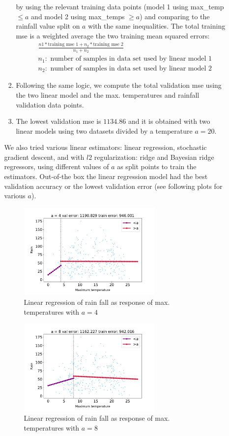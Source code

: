 \documentclass[12pt,twoside]{article}
\begin{document}
\begin{enumerate}
\begin{enumerate}
\begin{enumerate}[(1)]
		by using the relevant training data points (model 1 using max\_temp $\le a$ and  model 2 using max\_temps $\ge a$)
		and comparing to the rainfall value split on $a$ with the same inequalities. 
		The total training mse is a weighted average the two training mean squared errors: 
		\begin{align*}
			& \frac{n1 * \text{training mse  1} + n_2  * \text{training mse 2}} {n_1 + n_2} \\
			& n_1: \text{ number of samples in data set used by linear model 1} \\
			& n_2: \text{ number of samples in data set used by linear model 2}
		\end{align*}
		\item  Following the same logic, we compute the total validation mse using the two linear model and the max. temperatures and rainfall validation data points.
		\item The lowest validation mse is $1134.86$ and it is obtained with two linear models using two datasets divided by a temperature $a=20$.

	\end{enumerate}	
 	We also tried various linear estimators: linear regression, stochastic gradient descent, and with $l2$ regularization: ridge and Bayesian ridge regressors, 
	using different values of $a$ as split points to train the estimators.
	Out-of-the box the linear regression model had the best validation accuracy or the lowest validation error (see following plots for various $a$).
	
	\begin{figure}[H]
		\centering
		\includegraphics[width=200pt]{figures/a=4.pdf}
		\caption{Linear regression of rain fall as response of max. temperatures with $a=4$}
		\label{fig1}
	\end{figure}

	\begin{figure}[H]
		\centering
		\includegraphics[width=200pt]{figures/a=8.pdf}
		\caption{Linear regression of rain fall as response of max. temperatures with $a=8$}
		\label{fig2}
	\end{figure}


\end{enumerate}
\end{enumerate}
\end{document}
